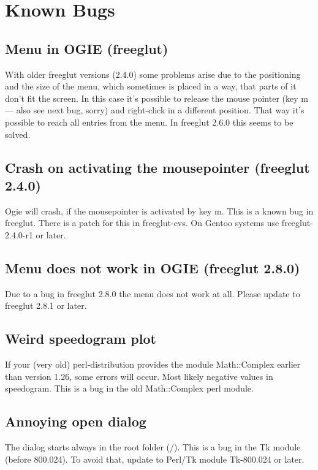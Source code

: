 \section{Known Bugs}
\label{bugs}

\subsection*{Menu in OGIE (freeglut)}
With older freeglut versions (2.4.0) some problems arise due to the positioning and the size of the
menu, which sometimes is placed in a way, that parts of it don't fit the screen.
In this case it's possible to release the mouse pointer (key m --- also see next bug, sorry) and right-click in a different position. That way it's possible to reach all entries from the menu.
In freeglut 2.6.0 this seems to be solved.

\subsection*{Crash on activating the mousepointer (freeglut 2.4.0)}
Ogie will crash, if the mousepointer is activated by key m. This is a known bug in freeglut.
There is a patch for this in freeglut-cvs. On Gentoo systems use freeglut-2.4.0-r1 or later.

\subsection*{Menu does not work in OGIE (freeglut 2.8.0)}
Due to a bug in freeglut 2.8.0 the menu does not work at all.
Please update to freeglut 2.8.1 or later.

\subsection*{Weird speedogram plot}
If your (very old) perl-distribution provides the module Math::Complex earlier
than version 1.26, some errors will occur. Most likely negative values in
speedogram. This is a bug in the old Math::Complex perl module.

\subsection*{Annoying open dialog}
The  dialog starts always in the root folder (/). This is  a bug in the
Tk module (before 800.024). To avoid that, update to Perl/Tk module Tk-800.024 or later.

